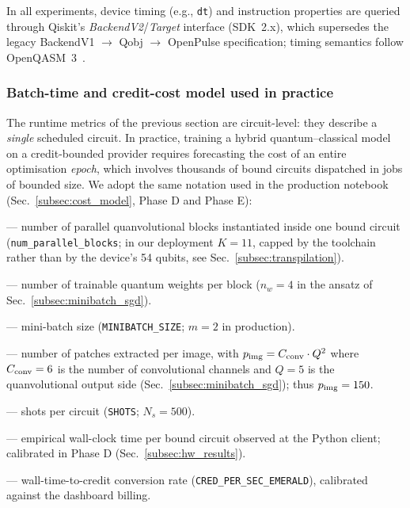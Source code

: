 In all experiments, device timing (e.g., \texttt{dt}) and instruction properties are queried through Qiskit’s \emph{BackendV2}/\emph{Target} interface (SDK~2.x), which supersedes the legacy BackendV1 $\xrightarrow{}$ Qobj $\xrightarrow{}$ OpenPulse specification; timing semantics follow OpenQASM~3~\cite{QiskitBackendV2Docs,QiskitTargetDocs,OpenQASM3TQC2022}.


\subsubsection*{Batch-time and credit-cost model used in practice}
\label{sec:batch-time-model}

The runtime metrics of the previous section are circuit-level: they describe a
\emph{single} scheduled circuit. In practice, training a hybrid quantum--classical
model on a credit-bounded provider requires forecasting the cost of an entire
optimisation \emph{epoch}, which involves thousands of bound circuits dispatched
in jobs of bounded size. We adopt the same notation used in the production
notebook (Sec.~\ref{subsec:cost_model}, Phase D and Phase E):

\begin{description}
\setlength\itemsep{0.15em}
\item[$K$] — number of parallel quanvolutional blocks instantiated inside one
  bound circuit (\texttt{num\_parallel\_blocks}; in our deployment $K=11$, capped
  by the toolchain rather than by the device's 54 qubits, see
  Sec.~\ref{subsec:transpilation}).
\item[$n_w$] — number of trainable quantum weights per block ($n_w=4$ in the
  ansatz of Sec.~\ref{subsec:minibatch_sgd}).
\item[$m$] — mini-batch size (\texttt{MINIBATCH\_SIZE}; $m=2$ in production).
\item[$p_{\rm img}$] — number of patches extracted per image, with
  $p_{\rm img}=C_{\rm conv}\cdot Q^2$ where $C_{\rm conv}=6$ is the number of
  convolutional channels and $Q=5$ is the quanvolutional output side
  (Sec.~\ref{subsec:minibatch_sgd}); thus $p_{\rm img}=150$.
\item[$N_s$] — shots per circuit (\texttt{SHOTS}; $N_s=500$).
\item[$\tau_{\rm circ}^{\rm wall}$] — empirical wall-clock time per bound circuit
  observed at the Python client; calibrated in Phase D
  (Sec.~\ref{subsec:hw_results}).
\item[$r_{\rm wc}$] — wall-time-to-credit conversion rate (\texttt{CRED\_PER\_SEC\_EMERALD}),
  calibrated against the dashboard billing.
\end{description}

